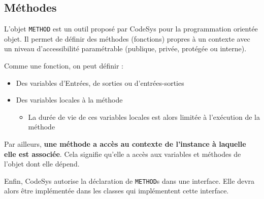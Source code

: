 \begin{UPSTIidee}{}
    
\end{UPSTIidee}




\subsection{Méthodes}
L'objet \lstinline{METHOD} est un outil proposé par CodeSys pour la programmation orientée objet. Il permet de définir des méthodes (fonctions) propres à un contexte avec un niveau d'accessibilité paramétrable (publique, privée, protégée ou interne).

Comme une fonction, on peut définir :
\begin{itemize}
    \item Des variables d'Entrées, de sorties ou d'entrées-sorties
    \item Des variables locales à la méthode
          \begin{itemize}
              \item La durée de vie de ces variables locales est alors limitée à l'exécution de la méthode
          \end{itemize}
\end{itemize}

Par ailleurs, \textbf{une méthode a accès au contexte de l'instance à laquelle elle est associée}. Cela signifie qu'elle a accès aux variables et méthodes de l'objet dont elle dépend.

Enfin, CodeSys autorise la déclaration de \lstinline{METHOD}s dans une interface. Elle devra alors être implémentée dans les classes qui implémentent cette interface.


